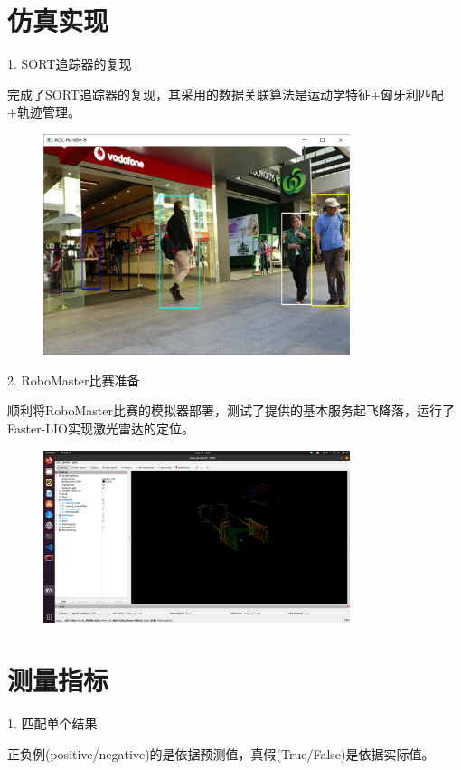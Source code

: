 \chapter{仿真实现}
1. SORT追踪器的复现

完成了SORT追踪器的复现，其采用的数据关联算法是运动学特征+匈牙利匹配+轨迹管理。
\begin{figure}[h!]
	\centering
	\includegraphics[width=0.8\textwidth]{images/sort.png}
\end{figure}


2. RoboMaster比赛准备

顺利将RoboMaster比赛的模拟器部署，测试了提供的基本服务起飞降落，运行了Faster-LIO实现激光雷达的定位。

\begin{figure}[h!]
	\centering
	\includegraphics[width=0.8\textwidth]{images/robo/lio.png}
\end{figure}


\chapter{测量指标}
1. 匹配单个结果

正负例(positive/negative)的是依据预测值，真假(True/False)是依据实际值。


